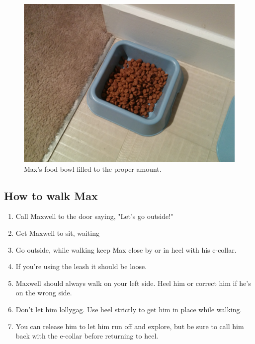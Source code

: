 \documentclass[pdftex,12pt]{article}
\begin{document}
\bigskip

\begin{figure}[h!]
    \centering
    \includegraphics[width=.35\textwidth]{./images/how_to/feed_max/food_bowl_filled.jpg}
    \caption{Max's food bowl filled to the proper amount.}
    \label{fig:food_bowl_filled}
\end{figure}

\subsection{How to walk Max}
\begin{enumerate}\label{itm:how_to_walk}
    \item Call Maxwell to the door saying, "Let's go outside!"
    \item Get Maxwell to sit, waiting
    \item Go outside, while walking keep Max close by or in heel with his
        e-collar.
    \item If you're using the leash it should be loose.
    \item Maxwell should always walk on your left side. Heel him or correct
        him if he's on the wrong side.
    \item Don't let him lollygag. Use heel strictly to get him in place while
        walking.
    \item You can release him to let him run off and explore, but be sure to
        call him back with the e-collar before returning to heel.
\end{enumerate}
\end{document}
